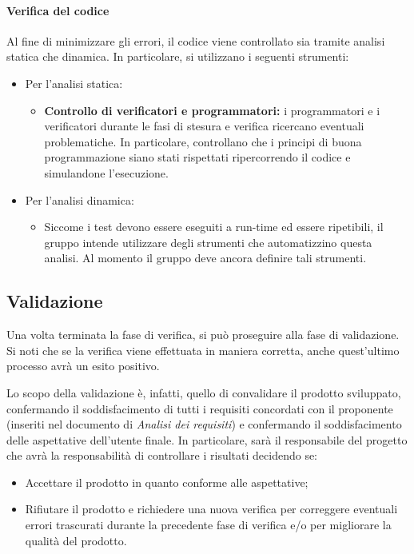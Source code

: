 \paragraph{Verifica del codice}
Al fine di minimizzare gli errori, il codice viene controllato sia tramite analisi statica che dinamica. In particolare, si utilizzano i seguenti strumenti:
\begin{itemize}
    \item Per l'analisi statica: 
        \begin{itemize}
            \item \textbf{Controllo di verificatori e programmatori:} i programmatori e i verificatori durante le fasi di stesura e verifica ricercano eventuali problematiche. In particolare, controllano che i principi di buona programmazione siano stati rispettati ripercorrendo il codice e simulandone l'esecuzione.
        \end{itemize}
    \item Per l'analisi dinamica: 
        \begin{itemize}
            \item Siccome i test devono essere eseguiti a run-time ed essere ripetibili, il gruppo intende utilizzare degli strumenti che automatizzino questa analisi. Al momento il gruppo deve ancora definire tali strumenti.
        \end{itemize}
\end{itemize}

\subsection{Validazione}\label{sec:processi_di_supporto:validazione}
Una volta terminata la fase di verifica, si può proseguire alla fase di validazione. Si noti che se la verifica viene effettuata in maniera corretta, anche quest'ultimo processo avrà un esito positivo.

Lo scopo della validazione è, infatti, quello di convalidare il prodotto sviluppato, confermando il soddisfacimento di tutti i requisiti concordati con il proponente (inseriti nel documento di \textit{Analisi dei requisiti})
e confermando il soddisfacimento delle aspettative dell'utente finale.
In particolare, sarà il responsabile del progetto che avrà la responsabilità di controllare i risultati decidendo se:
\begin{itemize}
    \item Accettare il prodotto in quanto conforme alle aspettative;
    \item Rifiutare il prodotto e richiedere una nuova verifica per correggere eventuali errori trascurati durante la precedente fase di verifica e/o per migliorare la qualità del prodotto.
\end{itemize}

